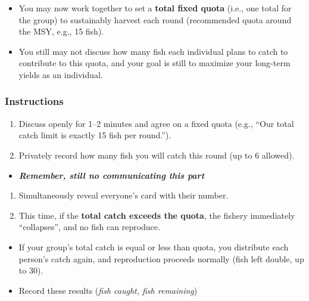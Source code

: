 \documentclass[]{tufte-handout}
\providecommand{\tightlist}{%
  \setlength{\itemsep}{0pt}\setlength{\parskip}{0pt}}
\begin{document}
\begin{itemize}
\tightlist
\item
  You may now work together to set a \textbf{total fixed quota} (i.e.,
  one total for the group) to sustainably harvest each round
  (recommended quota around the MSY, e.g., 15 fish).
\item
  You still may not discuss how many fish each individual plans to catch
  to contribute to this quota, and your goal is still to maximize your
  long-term yields as an individual.
\end{itemize}

\subsubsection{Instructions}\label{instructions-1}

\begin{enumerate}
\def\labelenumi{\arabic{enumi}.}
\tightlist
\item
  Discuss openly for 1--2 minutes and agree on a fixed quota (e.g.,
  ``Our total catch limit is exactly 15 fish per round.'').
\item
  Privately record how many fish you will catch this round (up to 6
  allowed).
\end{enumerate}

\begin{itemize}
\tightlist
\item
  \textbf{\emph{Remember, still no communicating this part}}
\end{itemize}

\begin{enumerate}
\def\labelenumi{\arabic{enumi}.}
\setcounter{enumi}{2}
\tightlist
\item
  Simultaneously reveal everyone's card with their number.
\item
  This time, if the \textbf{total catch exceeds the quota}, the fishery
  immediately ``collapses'', and no fish can reproduce.
\end{enumerate}

\begin{itemize}
\tightlist
\item
  If your group's total catch is equal or less than quota, you
  distribute each person's catch again, and reproduction proceeds
  normally (fish left double, up to 30).
\item
  Record these results (\emph{fish caught, fish remaining})
\end{itemize}
\end{document}

